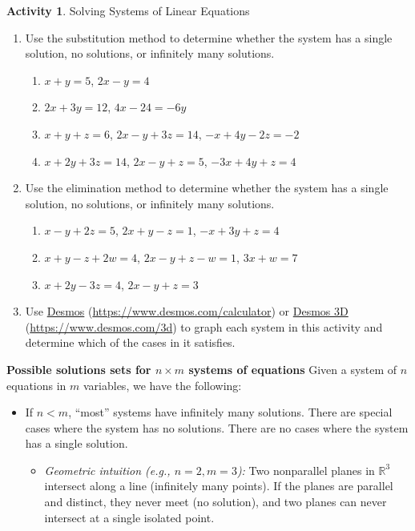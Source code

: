 \documentclass{article}
\theoremstyle{definition}
\newtheorem{activity}{Activity}
\newcounter{calloutbox}
\begin{document}
\begin{activity}Solving Systems of Linear Equations
    \begin{enumerate}
        \item Use the substitution method to determine whether the system has a single solution, no solutions, or infinitely many solutions.
        \begin{enumerate}[label=(\alph*)]
            \item \(x+y=5\), \(2x-y=4\)
            \item \(2x+3y=12\), \(4x-24=-6y\)
            \item \(x+y+z=6\), \(2x-y+3z=14\), \(-x+4y-2z=-2\)
            \item \(x+2y+3z=14\), \(2x-y+z=5\), \(-3x+4y+z=4\)
        \end{enumerate}
        \item Use the elimination method to determine whether the system has a single solution, no solutions, or infinitely many solutions.
        \begin{enumerate}[label=(\alph*)]
            \item \(x - y + 2z = 5\), \(2x + y - z = 1\), \(-x + 3y + z = 4\)
            \item \(x + y - z + 2w = 4\), \(2x - y + z - w = 1\), \(3x + w = 7\)
            \item \(x + 2y - 3z = 4\), \(2x - y + z = 3\)
        \end{enumerate}
        \item Use \href{https://www.desmos.com/calculator}{Desmos} (\url{https://www.desmos.com/calculator}) or \href{https://www.desmos.com/3d}{Desmos 3D} (\url{https://www.desmos.com/3d}) to graph each system in this activity and determine which of the cases in  it satisfies.
    \end{enumerate}
\begin{calloutbox}\label{box:solution-sets-taxonomy}
    \textbf{Possible solutions sets for \(n\times m\) systems of equations} Given a system of \(n\) equations in \(m\) variables, we have the following:
\begin{itemize}
    \item If \(n<m\), ``most'' systems have infinitely many solutions. There are special cases where the system has no solutions. There are no cases where the system has a single solution.
    \begin{itemize}
        \item \emph{Geometric intuition (e.g., \(n=2, m=3\)):} Two nonparallel planes in \(\mathbb{R}^3\) intersect along a line (infinitely many points). If the planes are parallel and distinct, they never meet (no solution), and two planes can never intersect at a single isolated point.

\end{itemize}
\end{itemize}
\end{calloutbox}
\end{activity}
\end{document}
